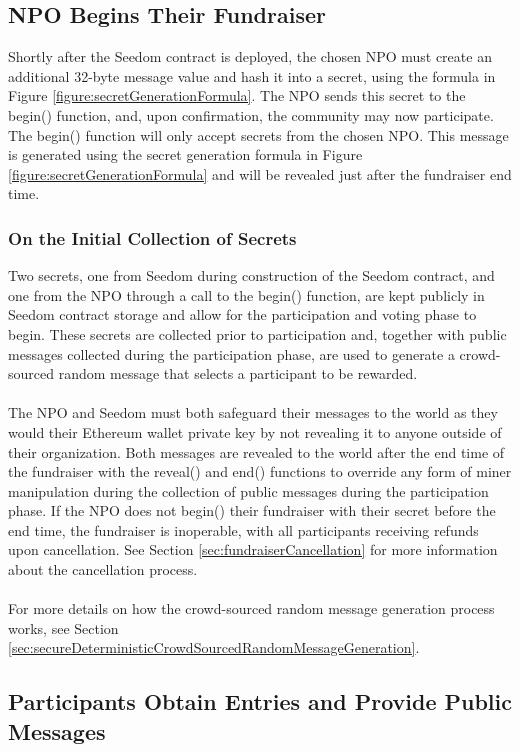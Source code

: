 \documentclass[11pt]{article}
\begin{document}
\subsection{NPO Begins Their Fundraiser}

Shortly after the Seedom contract is deployed, the chosen NPO must create an additional 32-byte message value and hash it into a secret, using the formula in Figure \ref{figure:secretGenerationFormula}. The NPO sends this secret to the begin() function, and, upon confirmation, the community may now participate. The begin() function will only accept secrets from the chosen NPO. This message is generated using the secret generation formula in Figure \ref{figure:secretGenerationFormula} and will be revealed just after the fundraiser end time.

\subsubsection{On the Initial Collection of Secrets}

Two secrets, one from Seedom during construction of the Seedom contract, and one from the NPO through a call to the begin() function, are kept publicly in Seedom contract storage and allow for the participation and voting phase to begin. These secrets are collected prior to participation and, together with public messages collected during the participation phase, are used to generate a crowd-sourced random message that selects a participant to be rewarded.\\\\
The NPO and Seedom must both safeguard their messages to the world as they would their Ethereum wallet private key by not revealing it to anyone outside of their organization. Both messages are revealed to the world after the end time of the fundraiser with the reveal() and end() functions to override any form of miner manipulation during the collection of public messages during the participation phase. If the NPO does not begin() their fundraiser with their secret before the end time, the fundraiser is inoperable, with all participants receiving refunds upon cancellation. See Section \ref{sec:fundraiserCancellation} for more information about the cancellation process.\\\\
For more details on how the crowd-sourced random message generation process works, see Section \ref{sec:secureDeterministicCrowdSourcedRandomMessageGeneration}.

\subsection{Participants Obtain Entries and Provide Public Messages}
\end{document}
